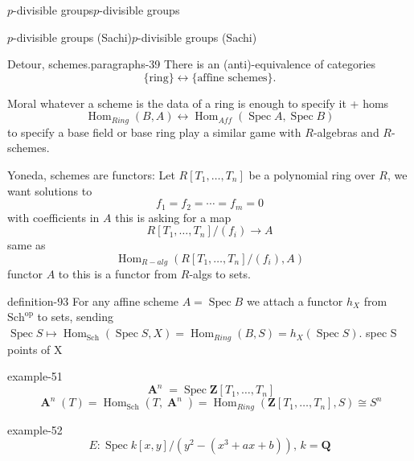 \documentclass[10pt,]{book}
\numberwithin{equation}{section}
\newcommand{\lb}{[}
\newcommand{\rb}{]}
\newcommand{\ZZ}{\mathbf{Z}}
\newcommand{\QQ}{\mathbf{Q}}
\newcommand{\op}{\mathrm{op}}
\DeclareMathOperator{\Hom}{Hom}
\DeclareMathOperator{\Spec}{Spec}
\DeclareMathOperator{\aff}{\mathbf{A}}
\begin{document}
\begin{chapterptx}{\(p\)-divisible groups}{}{\(p\)-divisible groups}{}{}
\begin{sectionptx}{\(p\)-divisible groups (Sachi)}{}{\(p\)-divisible groups (Sachi)}{}{}
%
\begin{paragraphs}{Detour, schemes.}{paragraphs-39}%
\hypertarget{p-988}{}%
There is an (anti)-equivalence of categories%
\begin{equation*}
\{\text{ring}\} \leftrightarrow\{\text{affine schemes}\}\text{.}
\end{equation*}
%
\par
\hypertarget{p-989}{}%
Moral whatever  a scheme is the data of a ring is enough to specify it + homs%
\begin{equation*}
\Hom_{Ring} (B,A) \leftrightarrow \Hom_{Aff}(\Spec A, \Spec B)
\end{equation*}
to specify a base field or base ring play a similar game with \(R\)-algebras and \(R\)-schemes.%
\par
\hypertarget{p-990}{}%
Yoneda, schemes are functors: Let \(R\lb T_1,\ldots,T_n\rb \) be a polynomial ring over \(R\), we want solutions to%
\begin{equation*}
f_1=  f_2 = \cdots = f_m = 0
\end{equation*}
with coefficients in \(A\) this is asking for  a map%
\begin{equation*}
R\lb T_1, \ldots ,T_n] /(f_i) \to A
\end{equation*}
same as%
\begin{equation*}
\Hom_{R-alg} (R[T_1,\ldots, T_n] /(f_i), A)
\end{equation*}
functor \(A\) to this is a functor from \(R\)-algs to sets.%
\begin{definition}{}{definition-93}%
\hypertarget{p-991}{}%
For any affine scheme \(A = \Spec B\) we attach a functor \(h_X\) from \(\mathrm{Sch}^\op\) to sets, sending \(\Spec S \mapsto \Hom_{\mathrm{Sch}} (\Spec S, X) = \Hom_{Ring} (B,S) = h_X(\Spec S)\). spec S points of X%
\end{definition}
\begin{example}{}{example-51}%
\hypertarget{p-992}{}%
%
\begin{equation*}
\aff^n = \Spec \ZZ \lb T_1,\ldots, T_n\rb
\end{equation*}
%
\begin{equation*}
\aff^n(T) = \Hom_{\mathrm{Sch}} (T, \aff^n) = \Hom_{Ring}(\ZZ[T_1,\ldots, T_n], S)\cong S^n
\end{equation*}
%
\end{example}
\begin{example}{}{example-52}%
\hypertarget{p-993}{}%
%
\begin{equation*}
E \colon \Spec k[x,y] / (y^2 - (x^3 + ax +b)),\,k = \QQ

\end{equation*}
\end{example}
\end{paragraphs}
\end{sectionptx}
\end{chapterptx}
\end{document}
